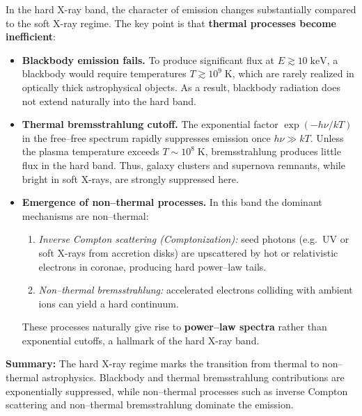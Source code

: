In the hard X-ray band, the character of emission changes
substantially compared to the soft X-ray regime. The key point is that
\textbf{thermal processes become inefficient}:

\begin{itemize}
    \item \textbf{Blackbody emission fails.}  
    To produce significant flux at $E \gtrsim 10\;\mathrm{keV}$, a
    blackbody would require temperatures $T \gtrsim 10^9\;\mathrm{K}$,
    which are rarely realized in optically thick astrophysical objects.
    As a result, blackbody radiation does not extend naturally into the
    hard band.

    \item \textbf{Thermal bremsstrahlung cutoff.}  
    The exponential factor $\exp(-h\nu/kT)$ in the free--free spectrum
    rapidly suppresses emission once $h\nu \gg kT$. Unless the plasma
    temperature exceeds $T \sim 10^8\;\mathrm{K}$, bremsstrahlung
    produces little flux in the hard band. Thus, galaxy clusters and
    supernova remnants, while bright in soft X-rays, are strongly
    suppressed here.

    \item \textbf{Emergence of non--thermal processes.}  
    In this band the dominant mechanisms are non--thermal:
    \begin{enumerate}
        \item \emph{Inverse Compton scattering (Comptonization):}
              seed photons (e.g.~UV or soft X-rays from accretion disks)
              are upscattered by hot or relativistic electrons in
              coronae, producing hard power--law tails.
        \item \emph{Non--thermal bremsstrahlung:} accelerated electrons
              colliding with ambient ions can yield a hard continuum.
    \end{enumerate}
    These processes naturally give rise to \textbf{power--law spectra}
    rather than exponential cutoffs, a hallmark of the hard X-ray band.
\end{itemize}

\begin{remark}
    \textbf{Summary:} The hard X-ray regime marks the transition from
    thermal to non--thermal astrophysics. Blackbody and thermal
    bremsstrahlung contributions are exponentially suppressed, while
    non--thermal processes such as inverse Compton scattering and
    non--thermal bremsstrahlung dominate the emission.
\end{remark}

